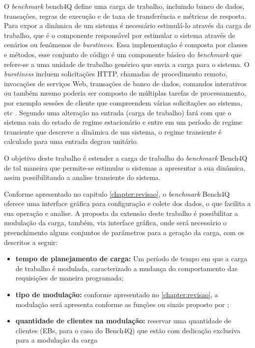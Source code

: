 O \textit{benchmark} bench4Q define uma carga de trabalho, incluindo banco de dados, transações, regras de execução e de taxa de transferência e métricas de resposta.  Para expor a dinâmica de um sistema é necessário estimulá-lo através da carga de trabalho, que é o componente responsável por estimular o sistema através de cenários ou fenômenos de \textit{burstiness}. Essa implementação é composta por classes e métodos, esse conjunto de código é um componente básico do \textit{benchmark} que refere-se a uma unidade de trabalho genérico que envia a carga para o sistema. O \textit{burstiness} incluem solicitações HTTP, chamadas de procedimento remoto, invocações de serviços Web, transações de banco de dados, comandos interativos ou também mesmo poderia ser composto de múltiplas tarefas de processamento, por exemplo sessões de cliente que compreendem várias solicitações ao sistema, etc \cite{Kounev2005}. Segundo \cite{Nobile2013} uma alteração na entrada (carga de trabalho) fará com que o sistema saia do estado de regime estacionário e entre em um período de regime transiente que descreve a dinâmica de um sistema, o regime transiente é calculado para uma entrada degrau unitário.

O objetivo deste trabalho é estender a carga de trabalho do \textit{benchmark} Bench4Q de tal maneira que permite-se estimular o sistemas a apresentar a sua dinâmica, assim possibilitando a analise transiente do sistema. 

Conforme apresentado no capitulo \ref{chapter:revisao}, o \textit{benchmark} Bench4Q oferece uma interface gráfica para configuração e colete dos dados, o que facilita a sua operação e analise. A proposta da extensão deste trabalho é possibilitar a modulação da carga, também, via interface gráfica, onde será necessário o preenchimento alguns conjuntos de parâmetros para a geração da carga, com os descritos a seguir:
\begin{itemize}
	\item \textbf{tempo de planejamento de carga:} Um período de tempo em que a carga de trabalho é modulada, caracterizado a mudança do comportamento das requisições de maneira programada;
	\item \textbf{tipo de modulação:} conforme apresentado no \ref{chapter:revisao}, a modulação será apresenta conforme as funções ou sinais proposto por \cite{Hellerstein2004};
	\item \textbf{quantidade de clientes na modulação:} reservar uma quantidade de clientes (EBs, para o caso do Bench4Q) que estão com dedicação exclusiva para a modulação da carga
\end{itemize}


